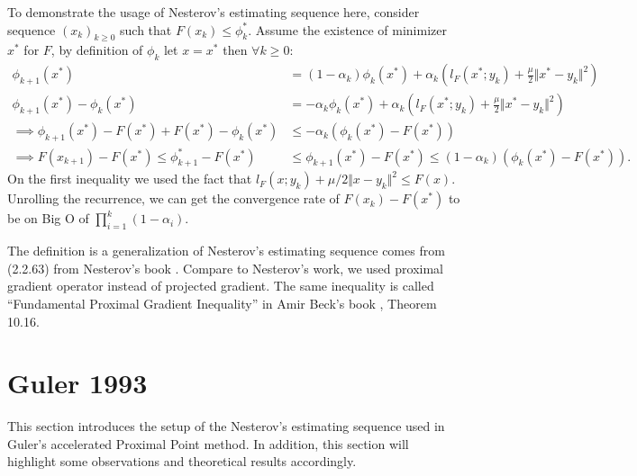 \documentclass[12pt]{article}
\begin{document}
    To demonstrate the usage of Nesterov's estimating sequence here, consider sequence $(x_k)_{k \ge 0}$ such that $F(x_k) \le \phi_k^*$. 
    Assume the existence of minimizer $x^*$ for $F$, by definition of $\phi_k$ let $x = x^*$ then $\forall k \ge 0$: 
    {\small
    \begin{align*}
        \phi_{k + 1}(x^*)
        &= (1 - \alpha_k)\phi_k (x^*) + 
        \alpha_k 
        \left(
            l_F(x^*; y_k) + \frac{\mu}{2}\Vert x^* - y_k\Vert^2
        \right)
        \\
        \phi_{k + 1}(x^*) - \phi_k(x^*) &= 
        -\alpha_k\phi_k(x^*) 
        +
        \alpha_k
        \left(
            l_F(x^*; y_k) + \frac{\mu}{2}\Vert x^* - y_k\Vert^2
        \right) 
        \\
        \implies
        \phi_{k + 1}(x^*) - F(x^*) + F(x^*) - \phi_k(x^*) 
        &\le -\alpha_k(\phi_k(x^*) - F(x^*))
        \\
        \implies 
        F(x_{k + 1}) - F(x^*)
        \le \phi_{k + 1}^* - F(x^*)
        &\le \phi_{k + 1}(x^*) - F(x^*)
        \le 
        (1 - \alpha_k)(\phi_k(x^*) - F(x^*)). 
    \end{align*}
    }
    On the first inequality we used the fact that $l_F(x; y_k) + \mu/2\Vert x - y_k\Vert^2\le F(x)$. 
    Unrolling the recurrence, we can get the convergence rate of $F(x_k) - F(x^*)$ to be on Big O of $\prod_{i = 1}^k(1 - \alpha_i)$. 
    \begin{remark}
        The definition is a generalization of Nesterov's estimating sequence comes from (2.2.63) from Nesterov's book \cite{nesterov_lectures_2018}. 
        Compare to Nesterov's work, we used proximal gradient operator instead of projected gradient. 
        The same inequality is called ``Fundamental Proximal Gradient Inequality'' in Amir Beck's book \cite{beck_first-order_2017}, Theorem 10.16. 
    \end{remark}

    
\section{Guler 1993}
    This section introduces the setup of the Nesterov's estimating sequence used in Guler's accelerated Proximal Point method. 
    In addition, this section will highlight some observations and theoretical results accordingly. 
    \begin{definition}\label{def:nes-est-seq-acc-ppm}
        
    \end{definition}
\end{document}
